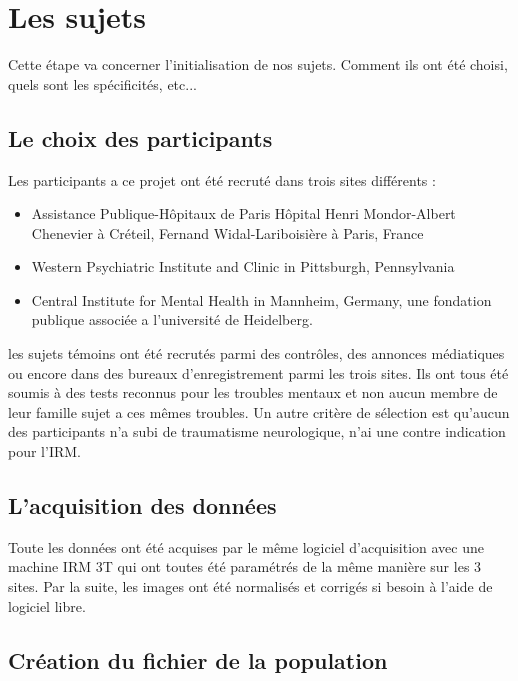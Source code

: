 \section{Les sujets}

Cette étape va concerner l'initialisation de nos sujets. Comment ils ont été choisi, quels sont les spécificités, etc...

\subsection{Le choix des participants}

Les participants a ce projet ont été recruté dans trois sites différents : 
\begin{itemize}
	\item Assistance Publique-Hôpitaux de Paris Hôpital Henri Mondor-Albert Chenevier à Créteil, Fernand Widal-Lariboisière à Paris, France
	\item Western Psychiatric Institute and Clinic in Pittsburgh, Pennsylvania
	\item Central Institute for Mental Health in Mannheim, Germany, une fondation publique associée a l'université de Heidelberg.
\end{itemize}
les sujets témoins ont été recrutés parmi des contrôles, des annonces médiatiques ou encore dans des bureaux d'enregistrement parmi les trois sites. Ils ont tous été soumis à des tests reconnus pour les troubles mentaux et non aucun membre de leur famille sujet a ces mêmes troubles. Un autre critère de sélection est qu'aucun des participants n'a subi de traumatisme neurologique, n'ai une contre indication pour l'IRM.


\subsection{L'acquisition des données}

Toute les données ont été acquises par le même logiciel d'acquisition avec une machine IRM 3T qui ont toutes été paramétrés de la même manière sur les 3 sites. Par la suite, les images ont été normalisés et corrigés si besoin à l'aide de logiciel libre.


\subsection{Création du fichier de la population} 

